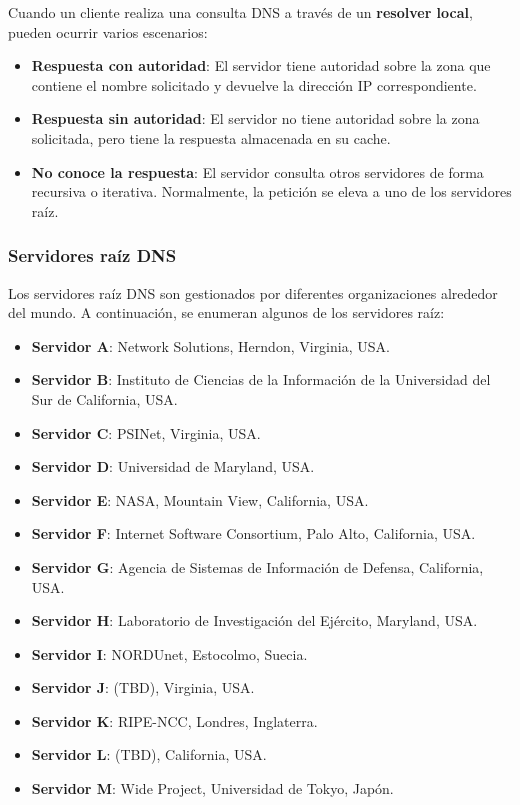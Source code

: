 \documentclass[a4paper,12pt]{article}
\begin{document}
Cuando un cliente realiza una consulta DNS a través de un \textbf{resolver local}, pueden ocurrir varios escenarios:

\begin{itemize}
    \item \textbf{Respuesta con autoridad}: El servidor tiene autoridad sobre la zona que contiene el nombre solicitado y devuelve la dirección IP correspondiente.
    \item \textbf{Respuesta sin autoridad}: El servidor no tiene autoridad sobre la zona solicitada, pero tiene la respuesta almacenada en su cache.
    \item \textbf{No conoce la respuesta}: El servidor consulta otros servidores de forma recursiva o iterativa. Normalmente, la petición se eleva a uno de los servidores raíz.
\end{itemize}

\subsubsection{Servidores raíz DNS}

Los servidores raíz DNS son gestionados por diferentes organizaciones alrededor del mundo. A continuación, se enumeran algunos de los servidores raíz:

\begin{itemize}
    \item \textbf{Servidor A}: Network Solutions, Herndon, Virginia, USA.
    \item \textbf{Servidor B}: Instituto de Ciencias de la Información de la Universidad del Sur de California, USA.
    \item \textbf{Servidor C}: PSINet, Virginia, USA.
    \item \textbf{Servidor D}: Universidad de Maryland, USA.
    \item \textbf{Servidor E}: NASA, Mountain View, California, USA.
    \item \textbf{Servidor F}: Internet Software Consortium, Palo Alto, California, USA.
    \item \textbf{Servidor G}: Agencia de Sistemas de Información de Defensa, California, USA.
    \item \textbf{Servidor H}: Laboratorio de Investigación del Ejército, Maryland, USA.
    \item \textbf{Servidor I}: NORDUnet, Estocolmo, Suecia.
    \item \textbf{Servidor J}: (TBD), Virginia, USA.
    \item \textbf{Servidor K}: RIPE-NCC, Londres, Inglaterra.
    \item \textbf{Servidor L}: (TBD), California, USA.
    \item \textbf{Servidor M}: Wide Project, Universidad de Tokyo, Japón.
\end{itemize}
\end{document}
